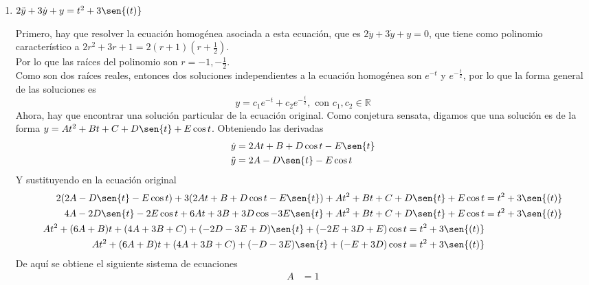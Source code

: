 \documentclass{article}
\begin{document}
\begin{enumerate}
{        }
        \item {
            $2\ddot y+3\dot y+y=t^2+3\sen{(t)}$

            \color{azul}
            Primero, hay que resolver la ecuación homogénea asociada a 
            esta ecuación, que es $2\ddot y+3\dot y+y=0$, que tiene como
            polinomio característico a $2r^2+3r+1 =
            2(r+1)(r+\frac{1}{2})$.\\
            Por lo que las raíces del polinomio son $r = -1, -\frac{1}{2}$.\\
            Como son dos raíces reales, entonces dos soluciones
            independientes a la ecuación homogénea son $e^{-t}$ y 
            $e^{-\frac{t}{2}}$, por lo que la forma general de las
            soluciones es
            \[y = c_1e^{-t} + c_2e^{-\frac{t}{2}}, \text{ con }
            c_1, c_2 \in \mathbb{R}\]
            Ahora, hay que encontrar una solución particular de la
            ecuación original.
            Como conjetura sensata, digamos que una solución es de la 
            forma $y = At^2+Bt+C+D\sen{t}+E\cos{t}$.
            Obteniendo las derivadas
            \begin{align*}
                \dot y &= 2At + B + D\cos{t} - E\sen{t} \\
                \ddot y &= 2A - D\sen{t} - E\cos{t}
            \end{align*}
            Y sustituyendo en la ecuación original
            \begin{align*}
                2(2A - D\sen{t} - E\cos{t}) +
                3(2At + B + D\cos{t} - E\sen{t}) +
                At^2 + Bt + C + D\sen{t} + E\cos{t} &=
                t^2+3\sen{(t)} \\
                4A - 2D\sen{t} - 2E\cos{t} +
                6At + 3B + 3D\cos - 3E\sen{t} +
                At^2 + Bt + C + D\sen{t} + E\cos{t} &=
                t^2+3\sen{(t)} \\
                At^{2} + (6A + B)t + (4A + 3B + C) + (-2D-3E+D)\sen{t} +
                (-2E+3D+E)\cos{t} = t^2+3\sen{(t)} \\
                 At^{2} + (6A + B)t + (4A + 3B + C) + (-D-3E)\sen{t} +
                (-E+3D)\cos{t} = t^2+3\sen{(t)}
            \end{align*}
            De aquí se obtiene el siguiente sistema de ecuaciones
            \begin{align*}
                A &= 1 \\

\end{align*}}
\end{enumerate}
\end{document}
